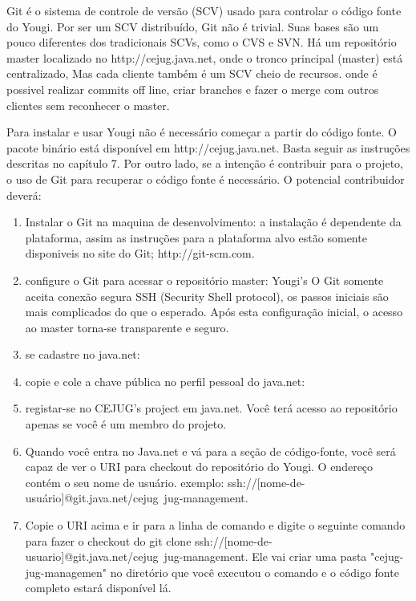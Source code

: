 \documentclass[envcountsame,envcountchap]{svmono}
\begin{document}
Git é o sistema de controle de versão (SCV) usado para controlar o código fonte do Yougi. Por ser um SCV distribuído, Git não é trivial. Suas bases são um pouco diferentes dos tradicionais SCVs, como o CVS e SVN. Há um repositório master localizado no http://cejug.java.net, onde o tronco principal (master) está centralizado, 
Mas cada cliente também é um SCV cheio de recursos. onde é possivel realizar commits off line, criar branches e fazer o merge com outros clientes sem reconhecer o master.

Para instalar e usar Yougi não é necessário começar a partir do código fonte. O pacote binário está disponível em http://cejug.java.net. Basta seguir as instruções descritas no capítulo 7. Por outro lado, se a intenção é contribuir para o projeto, o uso de Git para recuperar o código fonte é necessário. O potencial contribuidor deverá:

\begin{enumerate}
\item Instalar o Git na maquina de desenvolvimento: a instalação é dependente da plataforma, assim as instruções para a plataforma alvo estão somente disponiveis no site do Git; http://git-scm.com.
\item configure o Git para acessar o repositório master: Yougi's O Git somente aceita conexão segura SSH (Security Shell protocol), os passos iniciais são mais complicados do que o esperado. Após esta configuração inicial, o acesso ao master torna-se transparente e seguro.
\item se cadastre no java.net:
\item copie e cole a chave pública no perfil pessoal do java.net:
\item registar-se no CEJUG's project em java.net. Você terá acesso ao repositório apenas se você é um membro do projeto.
\item Quando você entra no Java.net e vá para a seção de código-fonte, você será capaz de ver o URI para checkout do repositório do Yougi. O endereço contém o seu nome de usuário. exemplo: ssh://[nome-de-usuário]@git.java.net/cejug~jug-management.
\item Copie o URI acima e ir para a linha de comando e digite o seguinte comando para fazer o checkout do git clone ssh://[nome-de-usuario]@git.java.net/cejug~jug-management. Ele vai criar uma pasta "cejug-jug-managemen" no diretório que você executou o comando e o código fonte completo estará disponível lá.
\end{enumerate}
\end{document}
